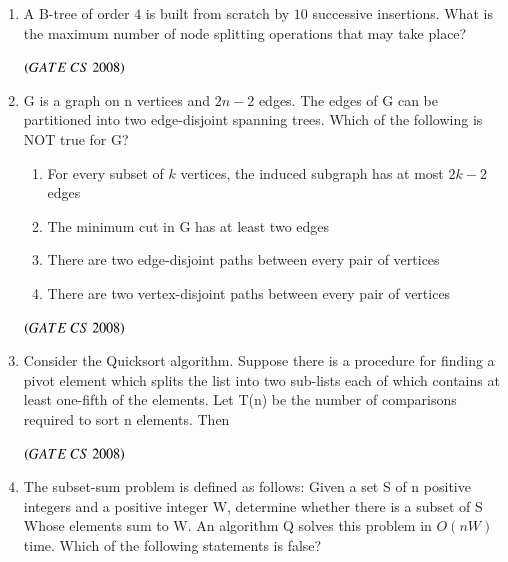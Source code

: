 \documentclass[journal]{IEEEtran}
\numberwithin{equation}{enumi}
\numberwithin{figure}{enumi}
\begin{document}
\begin{enumerate}
\item A B-tree of order $4$ is built from scratch by $10$ successive insertions. What is the maximum number of node splitting operations that may take place?
\begin{enumerate} 
\end{enumerate}
\hfill $\left(GATE\ CS\  2008\right)$

\item G is a graph on n vertices and $2n-2$ edges. The edges of G can be partitioned into two edge-disjoint spanning trees. Which of the following is NOT true for G?
\begin{enumerate}
   \item For every subset of $k$ vertices, the induced subgraph has at most $2k-2$ edges 
   \item The minimum cut in G has at least two edges
   \item There are two edge-disjoint paths between every pair of vertices 
   \item There are two vertex-disjoint paths between every pair of vertices 
\end{enumerate}
\hfill $\left(GATE\ CS\  2008\right)$
 
\item Consider the Quicksort algorithm. Suppose there is a procedure for finding a pivot element which splits the list into two sub-lists each of which contains at least one-fifth of the elements. Let T(n) be the number of comparisons required to sort n elements. Then
\begin{enumerate} 
\end{enumerate}
\hfill $\left(GATE\ CS\  2008\right)$

\item The subset-sum problem is defined as follows: Given a set S of n positive integers and a positive integer W, determine whether there is a subset of S Whose elements sum to W. 
An algorithm Q solves this problem in $O(nW)$ time. Which of the following
statements is false? 


\end{enumerate}
\end{document}
